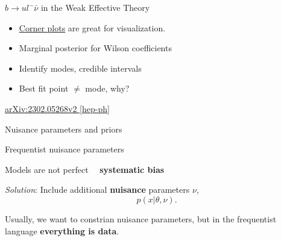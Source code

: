 \documentclass[
aspectratio=169,
14pt,
professionalfonts
]{beamer}
\newcommand{\arrow}{~\ding{220}~}
\begin{document}
\begin{frame}{$b\to u l^- \bar \nu$ in the Weak Effective Theory}
\begin{minipage}{0.49\textwidth}
\begin{itemize}
            \item \href{https://corner.readthedocs.io/en/latest/}{Corner plots} are great for visualization.
            \item Marginal posterior for Wilson coefficients
            \item Identify modes, credible intervals
            \item Best fit point $\neq$ mode, why?
        \end{itemize}
        \vspace{1cm}
        \begin{flushright}
            \href{https://arxiv.org/pdf/2302.05268}{arXiv:2302.05268v2 [hep-ph]}
        \end{flushright}
    \end{minipage}
\end{frame}

\begin{frame}
    \center
    \Large
    Nuisance parameters and priors
    \end{frame}
    
    \begin{frame}{Frequentist nuisance parameters}
    
    Models are not perfect \arrow \textbf{systematic bias}
    
    \textit{Solution}: Include additional \textbf{nuisance} parameters $\nu$,
    $$p(x|\theta, \nu).$$
    
    Usually, we want to constrian nuisance parameters, but in the frequentist language \textbf{everything is data}.
    
\end{frame}
    
    
\end{document}
